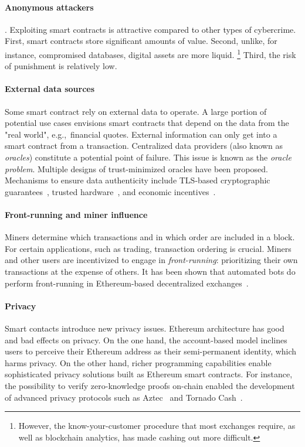 \paragraph{Anonymous attackers}.
Exploiting smart contracts is attractive compared to other types of cybercrime.
First, smart contracts store significant amounts of value.
Second, unlike, for instance, compromised databases, digital assets are more liquid.
\footnote{However, the know-your-customer procedure that most exchanges require, as well as blockchain analytics, has made cashing out more difficult.}
Third, the risk of punishment is relatively low.

\paragraph{External data sources}
Some smart contract rely on external data to operate.
A large portion of potential use cases envisions smart contracts that depend on the data from the "real world", e.g.,~financial quotes.
External information can only get into a smart contract from a transaction.
Centralized data providers (also known as \textit{oracles}) constitute a potential point of failure.
This issue is known as the \textit{oracle problem}.
Multiple designs of trust-minimized oracles have been proposed.
Mechanisms to ensure data authenticity include TLS-based cryptographic guarantees~\cite{Provable}, trusted hardware~\cite{Zhang2016}, and economic incentives~\cite{Chainlink}.

\paragraph{Front-running and miner influence}
Miners determine which transactions and in which order are included in a block.
For certain applications, such as trading, transaction ordering is crucial.
Miners and other users are incentivized to engage in \textit{front-running}: prioritizing their own transactions at the expense of others.
It has been shown that automated bots do perform front-running in Ethereum-based decentralized exchanges~\cite{Daian2019}.

\paragraph{Privacy}
Smart contacts introduce new privacy issues.
Ethereum architecture has good and bad effects on privacy.
On the one hand, the account-based model inclines users to perceive their Ethereum address as their semi-permanent identity, which harms privacy.
On the other hand, richer programming capabilities enable sophisticated privacy solutions built as Ethereum smart contracts.
For instance, the possibility to verify zero-knowledge proofs on-chain enabled the development of advanced privacy protocols such as Aztec~\cite{Aztec} and Tornado Cash~\cite{TornadoCash}.

